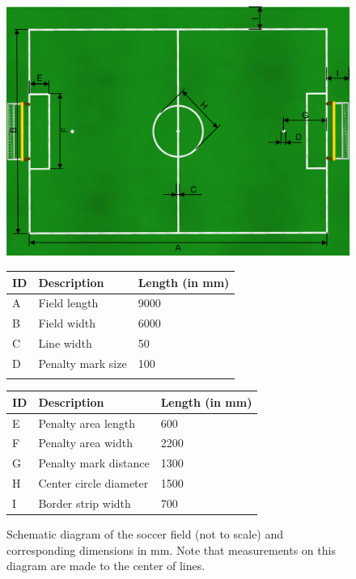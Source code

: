 \documentclass[12pt]{article}
\begin{document}
\begin{figure}[b!]
\centerline{\includegraphics[width=\columnwidth]{figs/fieldDimensions2014.pdf}}
\vspace{1ex}
\begin{tabular}{| l | l | l |}
ID & Description & Length (in mm) \\
\hline
A & Field length & 9000 \\
\hline
B & Field width & 6000 \\
\hline
C & Line width & 50 \\ 
\hline
D & Penalty mark size & 100 \\ 
\hline
 &  &  \\
\end{tabular}
\begin{tabular}{|l|l|l|}
ID & Description & Length (in mm) \\
\hline
E & Penalty area length & 600 \\
\hline
F & Penalty area width & 2200 \\
\hline
G & Penalty mark distance & 1300 \\ 
\hline
H & Center circle diameter & 1500 \\
\hline
I & Border strip width & 700 \\
\end{tabular}
\caption{Schematic diagram of the soccer field (not to scale) and corresponding dimensions in mm.  Note that measurements on this diagram are made to the center of lines.} \label{fig:field_dim}
\end{figure}
\end{document}
